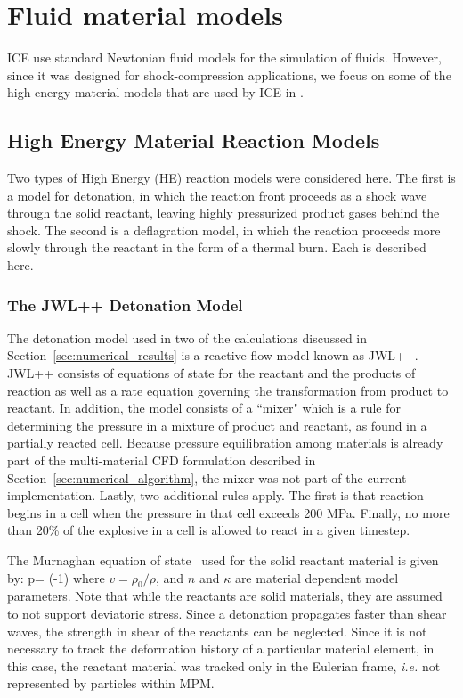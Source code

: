 \chapter{Fluid material models} \label{ch:ICEMaterials}
ICE use standard Newtonian fluid models for the simulation of fluids.  However,
since it was designed for shock-compression applications, we focus on some
of the high energy material models that are used by ICE in \Vaango.

\section{High Energy Material Reaction Models}\label{sec:HEReaction}

Two types of High Energy (HE) reaction models were considered here.  The first 
is a model for detonation, in which the reaction front proceeds as a shock 
wave through the solid reactant, leaving highly pressurized product gases 
behind the shock.  The second is a deflagration model, in which the 
reaction proceeds more slowly through the reactant in the form of a thermal
burn.  Each is described here.

\subsection{The JWL++ Detonation Model}\label{sec:JWLPP}

The detonation model used in two of the calculations discussed in 
Section~\ref{sec:numerical_results} is a reactive flow model known as 
JWL++\cite{JWLpp}.  JWL++ consists of equations of state for the
reactant and the products of reaction as well as a rate equation governing 
the transformation from product to reactant.  In addition, the model consists 
of a ``mixer" which is a rule for determining the pressure in a mixture of 
product and reactant, as found in a partially reacted cell.  Because pressure 
equilibration among materials is already part of the  multi-material CFD 
formulation described in Section~\ref{sec:numerical_algorithm}, the mixer was 
not part of the current implementation.  Lastly, two additional rules 
apply.  The first is that reaction begins in a cell when the pressure in that
cell exceeds 200 MPa.  Finally, no more than 20\% of the explosive in a cell 
is allowed to react in a given timestep.

The Murnaghan equation of state~\cite{Murnaghan1944} used for the solid reactant 
material is given by:
\Beq
  p= \left(-1\right)
  \label{Murnaghan}
\Eeq
where $v=\rho_0/\rho$, and $n$ and $\kappa$ are material dependent model 
parameters.  Note that while the reactants are solid materials, they are 
assumed to not support deviatoric stress.  Since a detonation propagates 
faster than shear waves, the strength in shear of the reactants can be 
neglected.  Since it is not necessary to track the deformation history 
of a particular material element, in this case, the reactant material was 
tracked only in the Eulerian frame, \textit{i.e.} not represented by 
particles within MPM.

